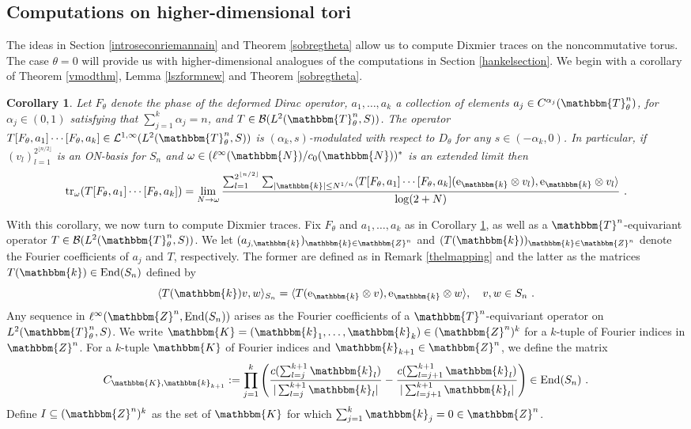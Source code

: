 \documentclass[10pt]{amsart}
\newtheorem{cor}[thm]{Corollary}
\theoremstyle{remark}
\theoremstyle{definition}
\begin{document}
\subsection{Computations on higher-dimensional tori}
\label{thetadefsubcomputing}

The ideas in Section \ref{introseconriemannain} and Theorem \ref{sobregtheta} allow us to compute Dixmier traces on the noncommutative torus. The case $\theta=0$ will provide us with higher-dimensional analogues of the computations in Section \ref{hankelsection}. We begin with a corollary of Theorem \ref{vmodthm}, Lemma \ref{lszformnew} and Theorem \ref{sobregtheta}. 

\begin{cor}
\label{thecaomp}
Let $F_\theta$ denote the phase of the deformed Dirac operator, $a_1,\ldots, a_k$ a collection of elements $a_j\in C^{\alpha_j}({\mathbbm{T}}^n_\theta)$, for $\alpha_j\in (0,1)$ satisfying that $\sum_{j=1}^k \alpha_j=n$, and $T\in {\mathcal{B}}(L^2({\mathbbm{T}}^n_\theta,S))$. The operator $T[F_\theta,a_1]\cdots[F_\theta,a_k]\in \mathcal{L}^{1,\infty}(L^2({\mathbbm{T}}^n_\theta,S))$ is $(\alpha_k,s)$-modulated with respect to $D_\theta$ for any $s\in (-\alpha_k,0)$. In particular, if $(v_l)_{l=1}^{2^{\lfloor n/2\rfloor}}$ is an ON-basis for $S_n$ and $\omega\in (\ell^\infty({\mathbbm{N}})/c_0({\mathbbm{N}}))^*$ is an extended limit then 
$${\mathrm{t}\mathrm{r}}_\omega(T[F_\theta,a_1]\cdots[F_\theta,a_k])=\lim_{N\to \omega}\frac{ \sum_{l=1}^{2^{\lfloor n/2\rfloor}}\sum_{|\mathbbm{k}|\leq N^{1/n}}\langle T[F_\theta,a_1]\cdots[F_\theta,a_k]({\mathrm{e}}_\mathbbm{k}\otimes v_l),{\mathrm{e}}_\mathbbm{k}\otimes v_l\rangle}{\log(2+N)}\ .$$
\end{cor}

With this corollary, we now turn to compute Dixmier traces. Fix $F_\theta$ and $a_1,\ldots, a_k$ as in Corollary \ref{thecaomp}, as well as a ${\mathbbm{T}}^n$-equivariant operator $T\in {\mathcal{B}}(L^2({\mathbbm{T}}^n_\theta,S))$. We let $(a_{j,\mathbbm{k}})_{\mathbbm{k}\in {\mathbbm{Z}}^n}$ and $(T(\mathbbm{k}))_{\mathbbm{k}\in {\mathbbm{Z}}^n}$ denote the Fourier coefficients of $a_j$ and $T$, respectively. The former are defined as in Remark \ref{thelmapping} and the latter as the matrices $T(\mathbbm{k})\in {\mathrm{End}}(S_n)$ defined by 
$$\langle T(\mathbbm{k})v,w\rangle_{S_n}=\langle T({\mathrm{e}}_\mathbbm{k}\otimes v),{\mathrm{e}}_\mathbbm{k}\otimes w\rangle, \quad v,w\in S_n\ .$$
Any sequence in $\ell^\infty({\mathbbm{Z}}^n,{\mathrm{End}}(S_n))$ arises as the Fourier coefficients of a ${\mathbbm{T}}^n$-equivariant operator on $L^2({\mathbbm{T}}^n_\theta,S)$. We write $\mathbbm{K}=(\mathbbm{k}_1,\ldots, \mathbbm{k}_k)\in ({\mathbbm{Z}}^n)^k$ for a $k$-tuple of Fourier indices in ${\mathbbm{Z}}^n$. For a $k$-tuple $\mathbbm{K}$ of Fourier indices and $\mathbbm{k}_{k+1}\in {\mathbbm{Z}}^n$, we define the matrix 
$$C_{\mathbbm{K},\mathbbm{k}_{k+1}}:=\prod_{j=1}^k\left(\frac{c(\sum_{l=j}^{k+1}\mathbbm{k}_l)}{|\sum_{l=j}^{k+1}\mathbbm{k}_l|}-\frac{c(\sum_{l=j+1}^{k+1}\mathbbm{k}_l)}{|\sum_{l=j+1}^{k+1}\mathbbm{k}_l|}\right)\in {\mathrm{End}}(S_n)\ .$$
Define $I\subseteq ({\mathbbm{Z}}^n)^k$ as the set of $\mathbbm{K}$ for which $\sum_{j=1}^k\mathbbm{k}_j=0\in {\mathbbm{Z}}^n$. 
\end{document}
